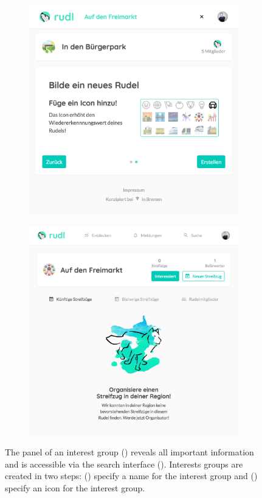 \documentclass[12pt,numbers=noenddot,parskip,bibliography=totocnumbered,listof=totocnumbered]{scrreprt}
\begin{document}
\begin{figure}
\begin{subfigure}[t]{0.45\textwidth}
\centering
\includegraphics[width=\linewidth]{createrudel1.png}
\caption{}
\label{createrudel1}
\end{subfigure}
\hfill
\begin{subfigure}[t]{0.45\textwidth}
\centering
\includegraphics[width=\linewidth]{rudel.png}
\caption{}
\label{rudel}
\end{subfigure}
\caption[Organization of interest groups]{The panel of an interest group () reveals all important information and is accessible via the search interface (). Interests groups are created in two steps: () specify a name for the interest group and () specify an icon for the interest group.}
\end{figure}
\end{document}
